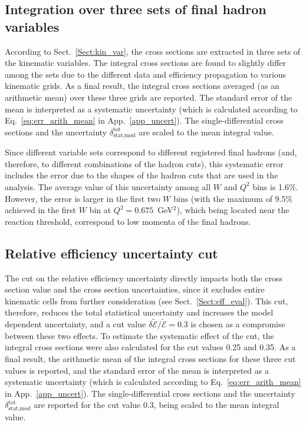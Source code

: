 \subsection*{Integration over three sets of final hadron variables}

According to Sect.~\ref{Sect:kin_var}, the cross sections are extracted in three sets of the kinematic variables. The integral cross sections are found to slightly differ among the sets due to the different data and efficiency propagation to various kinematic grids. As a final result, the integral cross sections averaged (as an arithmetic mean) over these three grids are reported. The standard error of the mean is interpreted as a systematic uncertainty (which is calculated according to Eq.~\eqref{eq:err_arith_mean} in App.~\ref{app_uncert}). The single-differential cross sections and the uncertainty $\delta_{\text{stat,mod}}^{\text{tot}}$ are scaled to the mean integral value. 

Since different variable sets correspond to different registered final hadrons (and, therefore, to different combinations of the hadron cuts), this systematic error includes the error due to the shapes of the hadron cuts that are used in the analysis. The average value of this uncertainty among all $W$ and $Q^{2}$ bins is 1.6\%. However, the error is larger in the first two $W$ bins (with the maximum of 9.5\% achieved in the first $W$ bin at $Q^{2} = 0.675$~GeV$^{2}$), which being located near the reaction threshold, correspond to low momenta of the final hadrons.  

\subsection*{Relative efficiency uncertainty cut}

The cut on the relative efficiency uncertainty directly impacts both the cross section value and the cross section uncertainties, since it excludes entire kinematic cells from further consideration (see Sect.~\ref{Sect:eff_eval}). This cut, therefore, reduces the total statistical uncertainty and increases the model dependent uncertainty, and a cut value $\delta \widetilde{\mathcal{E}}/\widetilde{\mathcal{E}} = 0.3$ is chosen as a compromise between these two effects. To estimate the systematic effect of the cut, the integral cross sections were also calculated for the cut values 0.25 and 0.35. As a final result, the arithmetic mean of the integral cross sections for these three cut values is reported, and the standard error of the mean is interpreted as a systematic uncertainty (which is calculated according to Eq.~\eqref{eq:err_arith_mean} in App.~\ref{app_uncert}). The single-differential cross sections and the uncertainty $\delta_{\text{stat,mod}}^{\text{tot}}$ are reported for the cut value 0.3, being scaled to the mean integral value.

